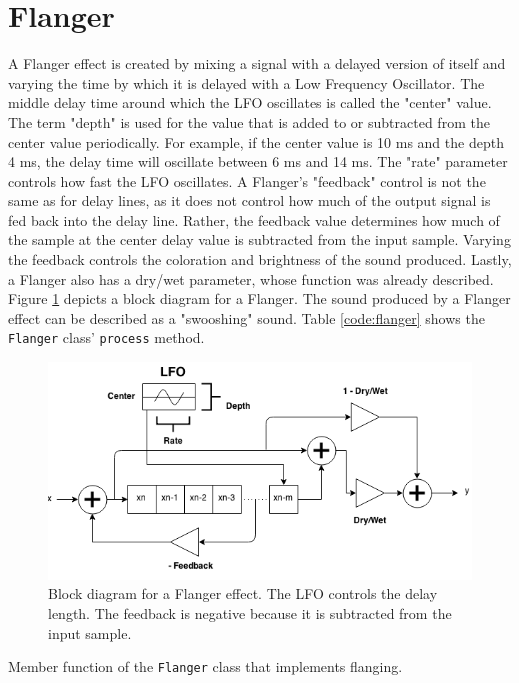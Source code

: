 \documentclass[12pt,twoside]{report}
\begin{document}
\section{Flanger}

A Flanger effect is created by mixing a signal with a delayed version of itself and varying the time by which it is delayed with a Low Frequency Oscillator. The middle delay time around which the LFO oscillates is called the "center" value. The term "depth" is used for the value that is added to or subtracted from the center value periodically. For example, if the center value is 10 ms and the depth 4 ms, the delay time will oscillate between 6 ms and 14 ms. The "rate" parameter controls how fast the LFO oscillates. A Flanger's "feedback" control is not the same as for delay lines, as it does not control how much of the output signal is fed back into the delay line. Rather, the feedback value determines how much of the sample at the center delay value is subtracted from the input sample. Varying the feedback controls the coloration and brightness of the sound produced. Lastly, a Flanger also has a dry/wet parameter, whose function was already described. Figure \ref{fig:flanger} depicts a block diagram for a Flanger. The sound produced by a Flanger effect can be described as a "swooshing" sound.  Table \ref{code:flanger} shows the \texttt{Flanger} class' \texttt{process} method.

\begin{figure}[p!]
  \includegraphics[scale=0.7]{img/flanger}
  \caption{Block diagram for a Flanger effect. The LFO controls the delay length. The feedback is negative because it is subtracted from the input sample. }
  \label{fig:flanger}
\end{figure}

\begin{table}[p!]
  \caption{Member function of the \texttt{Flanger} class that implements flanging.}
  \label{code:flanger}
\end{table}
\end{document}

